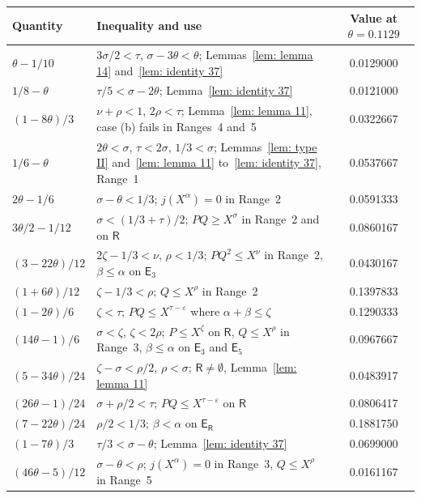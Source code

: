 \documentclass{article}
\numberwithin{equation}{section}
\newcommand{\Le}{\leqslant}
\newcommand{\Ge}{\geqslant}
\begin{document}
\begin{table}[ht]
\centering
\begin{tabular}{llc}
\toprule
Quantity & Inequality and use & Value at $\theta = 0.1129$ \\
\midrule
$\theta - 1/10$ & $3\sigma/2 < \tau$, $\sigma - 3\theta < \theta$; Lemmas~\ref{lem: lemma 14} and~\ref{lem: identity 37} & 0.0129000 \\
$1/8 - \theta$ & $\tau/5 < \sigma - 2\theta$; Lemma~\ref{lem: identity 37} & 0.0121000 \\
$(1 - 8\theta)/3$ & $\nu + \rho < 1$, $2\rho < \tau$; Lemma~\ref{lem: lemma 11}, case (b) fails in Ranges~4 and~5 & 0.0322667 \\
$1/6 - \theta$ & $2\theta < \sigma$, $\tau < 2\sigma$, $1/3 < \sigma$; Lemmas~\ref{lem: type II} and~\ref{lem: lemma 11} to~\ref{lem: identity 37}, Range~1 & 0.0537667 \\
$2\theta - 1/6$ & $\sigma - \theta < 1/3$; $j(X^{\alpha}) = 0$ in Range~2 & 0.0591333 \\
$3\theta/2 - 1/12$ & $\sigma < (1/3 + \tau)/2$; $PQ \Ge X^{\sigma}$ in Range~2 and on $\mathsf{R}$ & 0.0860167 \\
$(3 - 22\theta)/12$ & $2\zeta - 1/3 < \nu$, $\rho < 1/3$; $PQ^2 \Le X^{\nu}$ in Range~2, $\beta \Le \alpha$ on $\mathsf{E}_3$ & 0.0430167 \\
$(1 + 6\theta)/12$ & $\zeta - 1/3 < \rho$; $Q \Le X^{\rho}$ in Range~2 & 0.1397833 \\
$(1 - 2\theta)/6$ & $\zeta < \tau$; $PQ \Le X^{\tau - \varepsilon}$ where $\alpha + \beta \Le \zeta$ & 0.1290333 \\
$(14\theta - 1)/6$ & $\sigma < \zeta$, $\zeta < 2\rho$; $P \Le X^{\zeta}$ on $\mathsf{R}$, $Q \Le X^{\rho}$ in Range~3, $\beta \Le \alpha$ on $\mathsf{E}_3$ and $\mathsf{E}_5$ & 0.0967667 \\
$(5 - 34\theta)/24$ & $\zeta - \sigma < \rho/2$, $\rho < \sigma$; $\mathsf{R} \neq \emptyset$, Lemma~\ref{lem: lemma 11} & 0.0483917 \\
$(26\theta - 1)/24$ & $\sigma + \rho/2 < \tau$; $PQ \Le X^{\tau - \varepsilon}$ on $\mathsf{R}$ & 0.0806417 \\
$(7 - 22\theta)/24$ & $\rho/2 < 1/3$; $\beta < \alpha$ on $\mathsf{E}_{\mathsf{R}}$ & 0.1881750 \\
$(1 - 7\theta)/3$ & $\tau/3 < \sigma - \theta$; Lemma~\ref{lem: identity 37} & 0.0699000 \\
$(46\theta - 5)/12$ & $\sigma - \theta < \rho$; $j(X^{\alpha}) = 0$ in Range~3, $Q \Le X^{\rho}$ in Range~5 & 0.0161167 \\

\end{tabular}
\end{table}
\end{document}
